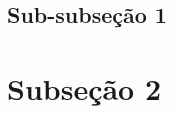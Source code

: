 \subsection[Sub-subseção 1]{Sub-subseção 1}\label{subsec:desenvolvimento-subsubsecao1}
    \lipsum[1]



\section[Subseção 2]{Subseção 2}\label{sec:desenvolvimento-subsecao2}
    \lipsum[1]
